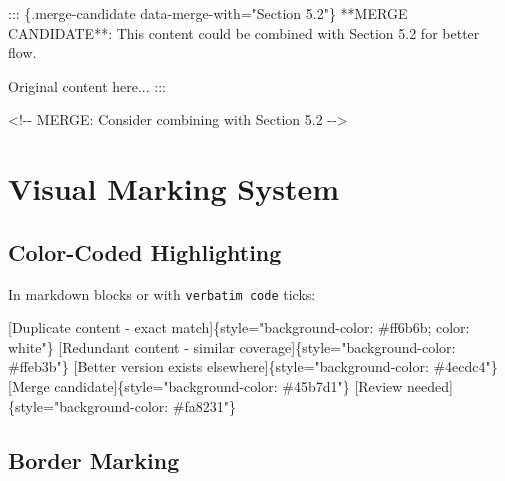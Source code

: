 \documentclass[
  11pt,
  letterpaper,
]{book}
\newenvironment{Shaded}{\begin{snugshade}}{\end{snugshade}}
\newcommand{\CommentTok}[1]{\textcolor[rgb]{0.37,0.37,0.37}{#1}}
\newcommand{\NormalTok}[1]{\textcolor[rgb]{0.00,0.23,0.31}{#1}}
\newcommand{\OtherTok}[1]{\textcolor[rgb]{0.00,0.23,0.31}{#1}}
\begin{document}
\begin{Shaded}
\begin{Highlighting}[]
\NormalTok{::: \{.merge{-}candidate data{-}merge{-}with="Section 5.2"\}}
\NormalTok{**MERGE CANDIDATE**: This content could be combined with Section 5.2 for better flow.}

\NormalTok{Original content here...}
\NormalTok{:::}

\CommentTok{\textless{}!{-}{-} MERGE: Consider combining with Section 5.2 {-}{-}\textgreater{}}
\end{Highlighting}
\end{Shaded}

\section*{Visual Marking System}\label{visual-marking-system}


\subsection*{Color-Coded Highlighting}\label{color-coded-highlighting}

In markdown blocks or with \texttt{verbatim\ code} ticks:

\begin{Shaded}
\begin{Highlighting}[]
\CommentTok{[}\OtherTok{Duplicate content {-} exact match}\CommentTok{]}\NormalTok{\{style="background{-}color: \#ff6b6b; color: white"\}}
\CommentTok{[}\OtherTok{Redundant content {-} similar coverage}\CommentTok{]}\NormalTok{\{style="background{-}color: \#ffeb3b"\}}
\CommentTok{[}\OtherTok{Better version exists elsewhere}\CommentTok{]}\NormalTok{\{style="background{-}color: \#4ecdc4"\}}
\CommentTok{[}\OtherTok{Merge candidate}\CommentTok{]}\NormalTok{\{style="background{-}color: \#45b7d1"\}}
\CommentTok{[}\OtherTok{Review needed}\CommentTok{]}\NormalTok{\{style="background{-}color: \#fa8231"\}}
\end{Highlighting}
\end{Shaded}

\subsection*{Border Marking}\label{border-marking}
\end{document}
